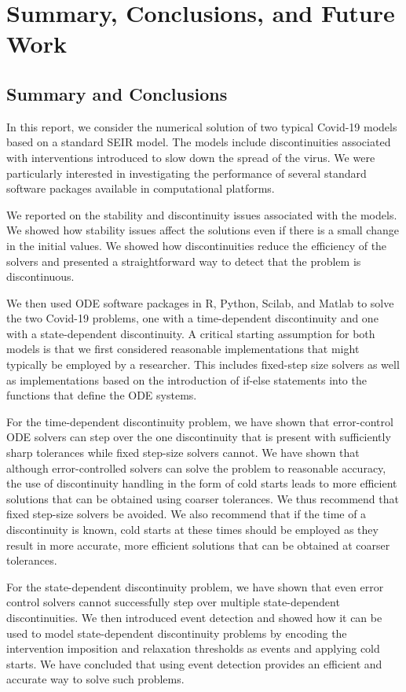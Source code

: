 \section{Summary, Conclusions, and Future Work}
\label{section:summary}
\subsection{Summary and Conclusions}
In this report, we consider the numerical solution of two typical Covid-19 models based on a standard SEIR model. The models include discontinuities associated with interventions introduced to slow down the spread of the virus. We were particularly interested in investigating the performance of several standard software packages available in computational platforms.

We reported on the stability and discontinuity issues associated with the models. We showed how stability issues affect the solutions even if there is a small change in the initial values. We showed how discontinuities reduce the efficiency of the solvers and presented a straightforward way to detect that the problem is discontinuous.

We then used ODE software packages in R, Python, Scilab, and Matlab to solve the two Covid-19 problems, one with a time-dependent discontinuity and one with a state-dependent discontinuity. A critical starting assumption for both models is that we first considered reasonable implementations that might typically be employed by a researcher. This includes fixed-step size solvers as well as implementations based on the introduction of if-else statements into the functions that define the ODE systems. 

For the time-dependent discontinuity problem, we have shown that error-control ODE solvers can step over the one discontinuity that is present with sufficiently sharp tolerances while fixed step-size solvers cannot. We have shown that although error-controlled solvers can solve the problem to reasonable accuracy, the use of discontinuity handling in the form of cold starts leads to more efficient solutions that can be obtained using coarser tolerances. We thus recommend that fixed step-size solvers be avoided. We also recommend that if the time of a discontinuity is known, cold starts at these times should be employed as they result in more accurate, more efficient solutions that can be obtained at coarser tolerances.

For the state-dependent discontinuity problem, we have shown that even error control solvers cannot successfully step over multiple state-dependent discontinuities. We then introduced event detection and showed how it can be used to model state-dependent discontinuity problems by encoding the intervention imposition and relaxation thresholds as events and applying cold starts. We have concluded that using event detection provides an efficient and accurate way to solve such problems.

